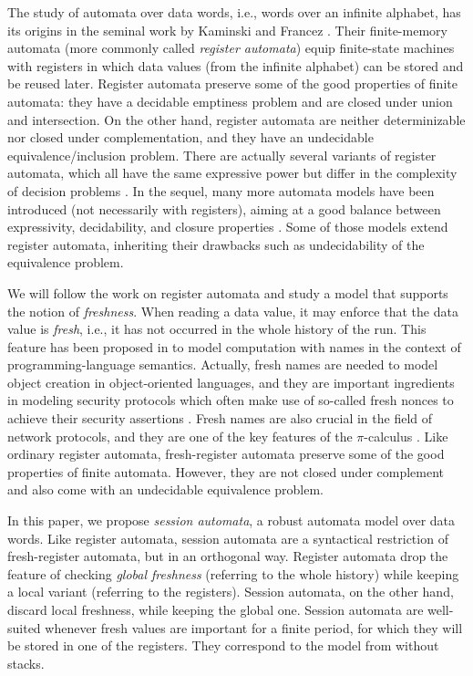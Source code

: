 \documentclass{LMCS}
\begin{document}
The study of automata over data words, i.e., words over an infinite
alphabet, has its origins in the seminal work by Kaminski and Francez
\cite{Kaminski1994}. Their finite-memory automata (more commonly
called \emph{register automata}) equip finite-state machines with
registers in which data values (from the infinite alphabet) can be
stored and be reused later. Register automata preserve some of the
good properties of finite automata: they have a decidable emptiness
problem and are closed under union and intersection. On the other
hand, register automata are neither determinizable nor closed under
complementation, and they have an undecidable equivalence/inclusion
problem. There are actually several variants of register automata,
which all have the same expressive power but differ in the complexity
of decision problems \cite{DL-tocl08,Bjorklund10}.
In the sequel, many more automata models have been introduced (not
necessarily with registers), aiming at a good balance between
expressivity, decidability, and closure properties
\cite{Neven2004,DL-tocl08,KaminskiZ10,BL2010,DBLP:conf/atva/GrumbergKS13,DBLP:conf/lata/GrumbergKS10}.
Some of those models extend register automata, inheriting their
drawbacks such as undecidability of the equivalence problem.

We will follow the work on register automata and study a model that
supports the notion of \emph{freshness}. When reading a data value, it
may enforce that the data value is \emph{fresh}, i.e., it has not
occurred in the whole history of the run. This feature has been
proposed in \cite{DBLP:conf/popl/Tzevelekos11} to model computation
with names in the context of programming-language semantics. Actually,
fresh names are needed to model object creation in object-oriented
languages, and they are
important ingredients in modeling security protocols which often make
use of so-called fresh nonces to achieve their security assertions
\cite{DBLP:conf/ccs/KurtzKW07}. Fresh names are also crucial in the
field of network protocols, and they are one of the key features of
the $\pi$-calculus \cite{MPW92}. Like ordinary register automata,
fresh-register automata preserve some of the good properties of finite
automata. However, they are not closed under complement and also come
with an undecidable equivalence problem.

In this paper, we propose \emph{session automata}, a robust automata
model over data words.
Like register automata, session automata are a syntactical restriction
of fresh-register automata, but in an orthogonal way. Register
automata drop the feature of checking \emph{global freshness} (referring to the
whole history) while keeping a local variant (referring to the
registers). Session automata, on the other hand, discard local
freshness, while keeping the global one. Session automata are
well-suited whenever fresh values are important for a finite period,
for which they will be stored in one of the registers. They correspond
to the model from \cite{BCGK-fossacs12} without stacks. 
\end{document}
